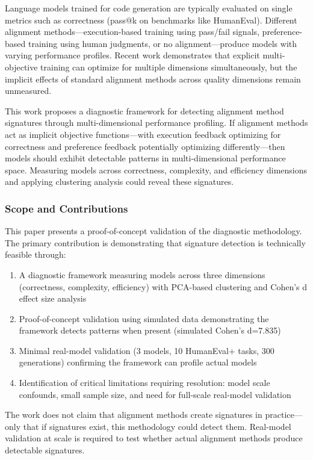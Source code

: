 
Language models trained for code generation are typically evaluated on single metrics such as correctness (pass@k on benchmarks like HumanEval). Different alignment methods---execution-based training using pass/fail signals, preference-based training using human judgments, or no alignment---produce models with varying performance profiles. Recent work demonstrates that explicit multi-objective training can optimize for multiple dimensions simultaneously, but the implicit effects of standard alignment methods across quality dimensions remain unmeasured.

This work proposes a diagnostic framework for detecting alignment method signatures through multi-dimensional performance profiling. If alignment methods act as implicit objective functions---with execution feedback optimizing for correctness and preference feedback potentially optimizing differently---then models should exhibit detectable patterns in multi-dimensional performance space. Measuring models across correctness, complexity, and efficiency dimensions and applying clustering analysis could reveal these signatures.

\subsubsection{Scope and Contributions}

This paper presents a proof-of-concept validation of the diagnostic methodology. The primary contribution is demonstrating that signature detection is technically feasible through:

\begin{enumerate}
\item A diagnostic framework measuring models across three dimensions (correctness, complexity, efficiency) with PCA-based clustering and Cohen's d effect size analysis
\item Proof-of-concept validation using simulated data demonstrating the framework detects patterns when present (simulated Cohen's d=7.835)  
\item Minimal real-model validation (3 models, 10 HumanEval+ tasks, 300 generations) confirming the framework can profile actual models
\item Identification of critical limitations requiring resolution: model scale confounds, small sample size, and need for full-scale real-model validation
\end{enumerate}

The work does not claim that alignment methods create signatures in practice---only that if signatures exist, this methodology could detect them. Real-model validation at scale is required to test whether actual alignment methods produce detectable signatures.

